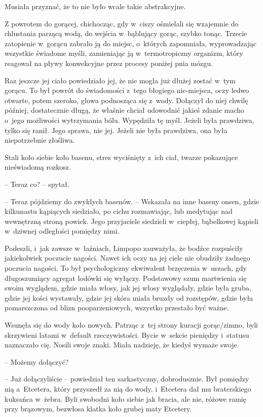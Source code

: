 \documentclass[oneside,polish,11pt,sfheadings]{mwbk}
\begin{document}
Musiała przyznać, że to nie było wcale takie abstrakcyjne.

Z powrotem do gorącej, chichocząc, gdy w~ciszy ośmielali się wzajemnie
do chlustania parzącą wodą, do wejścia w~bąblujący gorąc, szybko tonąc.
Trzecie zatopienie w~gorącu zabrało ją do miejsc, o~których zapomniała,
wyprowadzając wszystkie świadome myśli, zamieniając ją w~termotropiczny
organizm, który reagował na pływy konwekcyjne przez procesy poniżej pnia
mózgu.

Raz jeszcze jej ciało powiedziało jej, że nie mogła już dłużej zostać w~tym gorącu. To był powrót do świadomości z~tego błogiego nie-miejsca,
oczy ledwo otwarte, potem szeroko, głowa podnosząca się z~wody. Dołączył
do niej chwilę później, dostatecznie długą, że właśnie chciał udowodnić
jakieś zdanie macho o~jego możliwości wytrzymania bólu. Wypędziła tę
myśl. Jeżeli była prawdziwa, tylko się ranił. Jego sprawa, nie jej.
Jeżeli nie była prawdziwa, ona była niepotrzebnie złośliwa.

Stali koło siebie koło basenu, stres wyciśnięty z~ich ciał, twarze
pokazujące nieświadomą rozkosz.

-- Teraz co? -- spytał.

-- Teraz pójdziemy do zwykłych basenów. -- Wskazała na inne baseny onsen,
gdzie kilkunastu kąpiących siedziało, po cichu rozmawiając, lub
medytując nad wewnętrzną stroną powiek. Jego przyjaciele siedzieli w~ciepłej, bąbelkowej kąpieli w~dziwnej odległości pomiędzy nimi.

Podeszli, i~jak zawsze w~łaźniach, Limpopo zauważyła, że bodźce
rozpuściły jakiekolwiek poczucie nagości. Nawet ich oczy na jej ciele
nie obudziły żadnego poczucia nagości. To był psychologiczny ekwiwalent
brzęczenia w~uszach, gdy długoszumiący agregat lodówki się wyłączy.
Podstawowy szum martwienia się swoim wyglądem, gdzie miała włosy, jak
jej włosy wyglądały, gdzie była gruba, gdzie jej kości wystawały, gdzie
jej skóra miała bruzdy od rozstępów, gdzie była pomarszczona od blizn
pooparzeniowych, wszystko przestało być ważne.

Wsunęła się do wody koło nowych. Patrząc z~tej strony kuracji
gorąc/zimno, byli skrzywieni latami w~default \dywiz rzeczywistości. Bycie w~sekcie pieniędzy i~statusu naznaczało cię. Nosili swoje znaki. Miała
nadzieję, że kiedyś wymaże swoje.

-- Możemy dołączyć?

-- Już dołączyliście -- powiedział ten sarkastyczny, dobrodusznie. Był
pomiędzy nią a~Etcetera, który przyszedł za nią do wody, i~Etcetera dał
mu braterskiego kuksańca w~żebra. Byli swobodni koło siebie jak bracia,
ale nie, różowe ramię przy brązowym, bezwłosa klatka koło grubej maty
Etcetery.
\end{document}
